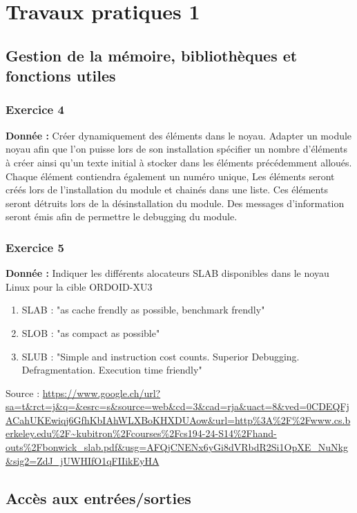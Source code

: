 \section{Travaux pratiques 1}
\subsection{Gestion de la mémoire, bibliothèques et fonctions utiles}
\subsubsection{Exercice 4}
\noindent
\textbf{Donnée : }Créer dynamiquement des éléments dans le noyau. Adapter un module noyau afin que l'on puisse lors de son installation spécifier un nombre d'éléments à créer ainsi qu'un texte initial à stocker dans les éléments précédemment alloués. Chaque élément contiendra également un numéro unique, Les éléments seront créés lors de l'installation du module et chainés dans une liste. Ces éléments seront détruits lors de la désinstallation du module. Des messages d'information seront émis afin de permettre le debugging du module.
\subsubsection{Exercice 5}
\noindent
\textbf{Donnée : }Indiquer les différents alocateurs SLAB disponibles dans le noyau Linux pour la cible ORDOID-XU3
\begin{enumerate}
	\item SLAB : "as cache frendly as possible, benchmark frendly"
	\item SLOB : "as compact as possible"
	\item SLUB : "Simple and instruction cost counts. Superior Debugging. Defragmentation. Execution time friendly"
\end{enumerate}
Source : \url{https://www.google.ch/url?sa=t&rct=j&q=&esrc=s&source=web&cd=3&cad=rja&uact=8&ved=0CDEQFjACahUKEwiqj6GfhKbIAhWLXBoKHXDUAow&url=http%3A%2F%2Fwww.cs.berkeley.edu%2F~kubitron%2Fcourses%2Fcs194-24-S14%2Fhand-outs%2Fbonwick_slab.pdf&usg=AFQjCNENx6yGi8dVRbdR2Si1OpXE_NuNkg&sig2=ZdJ_jUWHIfO1qFIIikEyHA}
	
\subsection{Accès aux entrées/sorties}
